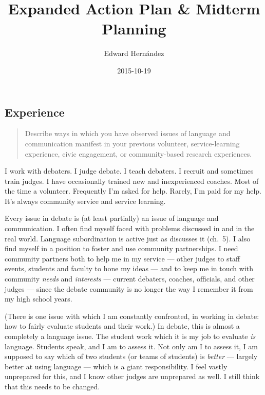 \documentclass[man,12pt,natbib]{apa6}
\begin{document}
\title{Expanded Action Plan \& Midterm Planning}
\author{Edward Hern\'{a}ndez}
\date{2015-10-19}
\maketitle


\subsection{Experience}\label{experience}

\begin{quote}
	Describe ways in which you have observed issues of language and
	communication manifest in your previous volunteer, service-learning
	experience, civic engagement, or community-based research experiences.
\end{quote}

I work with debaters. I judge debate. I teach debaters. I recruit and sometimes
train judges. I have occasionally trained new and inexperienced coaches. Most
of the time a volunteer. Frequently I'm asked for help. Rarely, I'm paid for my
help. It's always community service and service learning.

Every issue in debate is (at least partially) an issue of language and
communication. I often find myself faced with problems discussed in
\citet{Lippi-Green11} and \citet{Cress13} in the real world. Language
subordination is active just as \citet{Lippi-Green11} discusses it (ch.~5). I
also find myself in a position to foster and use community partnerships. I need
community partners both to help me in my service --- other judges to staff
events, students and faculty to hone my ideas --- and to keep me in touch with
community \emph{needs} and \emph{interests} \citep[ch.~2]{Cress13} --- current
debaters, coaches, officials, and other judges --- since the debate community
is no longer the way I remember it from my high school years.

(There is one issue with which I am constantly confronted, in working in
debate: how to fairly evaluate students and their work.) In debate, this is
almost a completely a language issue. The student work which it is my job to
evaluate \emph{is} language. Students speak, and I am to assess it. Not only am
I to assess it, I am supposed to say which of two students (or teams of
students) is \emph{better} --- largely better at using language --- which is a
giant responsibility. I feel vastly unprepared for this, and I know other
judges are unprepared as well. I still think that this needs to be changed.
\end{document}
